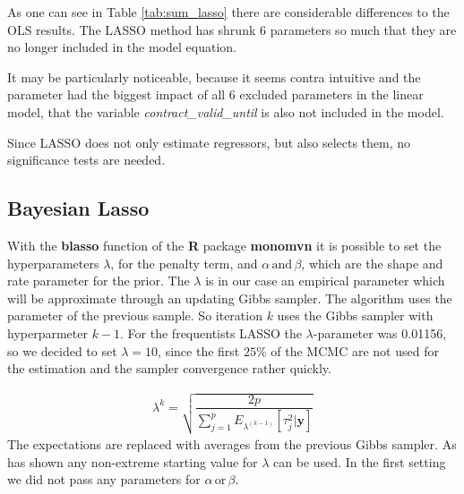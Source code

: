 \documentclass[12pt,a4paper]{article}
\begin{document}
As one can see in Table \ref{tab:sum_lasso} there are considerable
differences to the \ac{OLS} results. The \ac{LASSO} method has shrunk 6
parameters so much that they are no longer included in the model
equation.

It may be particularly noticeable, because it seems contra intuitive and
the parameter had the biggest impact of all 6 excluded parameters in the
linear model, that the variable \emph{contract\_valid\_until} is also
not included in the model.

Since LASSO does not only estimate regressors, but also selects them, no
significance tests are needed.

\hypertarget{bayesian-lasso-1}{%
\subsection{Bayesian Lasso}\label{bayesian-lasso-1}}

With the \textbf{blasso} function of the \textbf{R} package
\textbf{monomvn} it is possible to set the hyperparameters \(\lambda\),
for the penalty term, and \(\alpha \, \text{and} \, \beta\), which are
the shape and rate parameter for the prior. The \(\lambda\) is in our
case an empirical parameter which will be approximate through an
updating Gibbs sampler. The algorithm uses the parameter of the previous
sample. So iteration \(k\) uses the Gibbs sampler with hyperparmeter
\(k-1\). For the frequentists \ac{LASSO} the \(\lambda\)-parameter was
0.01156, so we decided to set \(\lambda = 10\), since the first
\(25 \%\) of the \ac{MCMC} are not used for the estimation and the
sampler convergence rather quickly. \autocite{gramacy_monomvn_2019}

\FloatBarrier

\begin{align*} 
  \lambda^{k} = \sqrt{\dfrac{2p}{\displaystyle \sum_{j = 1}^{p} E_{\lambda^{(k-1)}} [\tau_j^2| \pmb{y}] }}
\end{align*} \FloatBarrier The expectations are replaced with averages
from the previous Gibbs sampler. As \textcite{park_bayesian_2008} has
shown any non-extreme starting value for \(\lambda\) can be used. In the
first setting we did not pass any parameters for
\(\alpha \, \text{or} \, \beta\).
\end{document}
